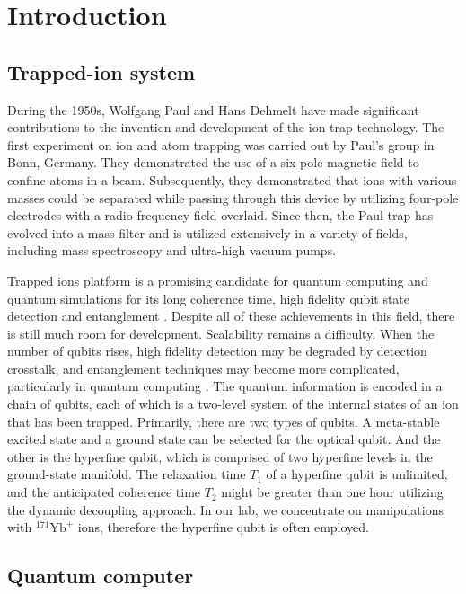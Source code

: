 
\chapter{Introduction}

\section{Trapped-ion system}

During the 1950s, Wolfgang Paul and Hans Dehmelt have made significant contributions to the invention and development of the ion trap technology. The first experiment on ion and atom trapping was carried out by Paul's group in Bonn, Germany. They demonstrated the use of a six-pole magnetic field to confine atoms in a beam. Subsequently, they demonstrated that ions with various masses could be separated while passing through this device by utilizing four-pole electrodes with a radio-frequency field overlaid. Since then, the Paul trap \cite{RevModPhys.62.531} has evolved into a mass filter and is utilized extensively in a variety of fields, including mass spectroscopy and ultra-high vacuum pumps.

Trapped ions platform is a promising candidate for quantum computing and quantum simulations for its long coherence time, high fidelity qubit state detection and entanglement \cite{RN297,RN125}. Despite all of these achievements in this field, there is still much room for development. Scalability remains a difficulty. When the number of qubits rises, high fidelity detection may be degraded by detection crosstalk, and entanglement techniques may become more complicated, particularly in quantum computing \cite{RN125}. The quantum information is encoded in a chain of qubits, each of which is a two-level system of the internal states of an ion that has been trapped. Primarily, there are two types of qubits. A meta-stable excited state and a ground state can be selected for the optical qubit. And the other is the hyperfine qubit, which is comprised of two hyperfine levels in the ground-state manifold. The relaxation time $T_1$ of a hyperfine qubit is unlimited, and the anticipated coherence time $T_2$ might be greater than one hour utilizing the dynamic decoupling approach. In our lab, we concentrate on manipulations with ${ }^{171} \mathrm{Yb}^{+}$ ions, therefore the hyperfine qubit is often employed.



\section{Quantum computer}

